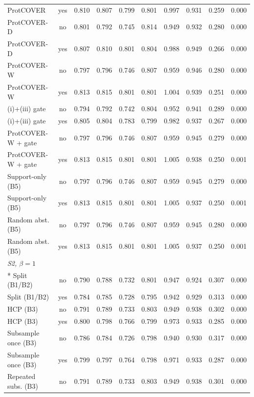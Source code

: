\begin{longtable}{lccccccccc}
ProtCOVER & yes & 0.810 & 0.807 & 0.799 & 0.801 & 0.997 & 0.931 & 0.259 & 0.000 \\
ProtCOVER-D & no & 0.801 & 0.792 & 0.745 & 0.814 & 0.949 & 0.932 & 0.280 & 0.000 \\
ProtCOVER-D & yes & 0.807 & 0.810 & 0.801 & 0.804 & 0.988 & 0.949 & 0.266 & 0.000 \\
ProtCOVER-W & no & 0.797 & 0.796 & 0.746 & 0.807 & 0.959 & 0.946 & 0.280 & 0.000 \\
ProtCOVER-W & yes & 0.813 & 0.815 & 0.801 & 0.801 & 1.004 & 0.939 & 0.251 & 0.000 \\
(i)+(iii) gate & no & 0.794 & 0.792 & 0.742 & 0.804 & 0.952 & 0.941 & 0.289 & 0.000 \\
(i)+(iii) gate & yes & 0.805 & 0.804 & 0.783 & 0.799 & 0.982 & 0.937 & 0.267 & 0.000 \\
ProtCOVER-W + gate & no & 0.797 & 0.796 & 0.746 & 0.807 & 0.959 & 0.945 & 0.279 & 0.000 \\
ProtCOVER-W + gate & yes & 0.813 & 0.815 & 0.801 & 0.801 & 1.005 & 0.938 & 0.250 & 0.001 \\
Support-only (B5) & no & 0.797 & 0.796 & 0.746 & 0.807 & 0.959 & 0.945 & 0.279 & 0.000 \\
Support-only (B5) & yes & 0.813 & 0.815 & 0.801 & 0.801 & 1.005 & 0.937 & 0.250 & 0.001 \\
Random abst. (B5) & no & 0.797 & 0.796 & 0.746 & 0.807 & 0.959 & 0.945 & 0.280 & 0.000 \\
Random abst. (B5) & yes & 0.813 & 0.815 & 0.801 & 0.801 & 1.005 & 0.937 & 0.250 & 0.001 \\
\midrule
\multicolumn{10}{l}{\emph{S2, $\beta=1$}}\\*
Split (B1/B2) & no & 0.790 & 0.788 & 0.732 & 0.801 & 0.947 & 0.924 & 0.307 & 0.000 \\
Split (B1/B2) & yes & 0.784 & 0.785 & 0.728 & 0.795 & 0.942 & 0.929 & 0.313 & 0.000 \\
HCP (B3) & no & 0.791 & 0.789 & 0.733 & 0.803 & 0.949 & 0.938 & 0.302 & 0.000 \\
HCP (B3) & yes & 0.800 & 0.798 & 0.766 & 0.799 & 0.973 & 0.933 & 0.285 & 0.000 \\
Subsample once (B3) & no & 0.786 & 0.784 & 0.726 & 0.798 & 0.940 & 0.930 & 0.317 & 0.000 \\
Subsample once (B3) & yes & 0.799 & 0.797 & 0.764 & 0.798 & 0.971 & 0.933 & 0.287 & 0.000 \\
Repeated subs. (B3) & no & 0.791 & 0.789 & 0.733 & 0.803 & 0.949 & 0.938 & 0.301 & 0.000 \\

\end{longtable}

